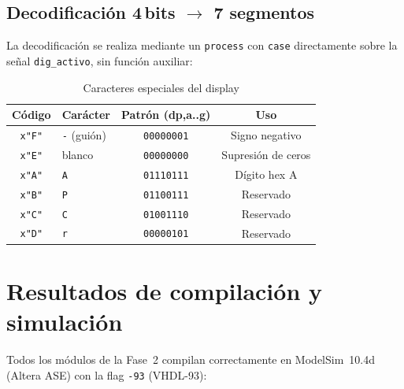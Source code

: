 \documentclass[memoria_final]{subfiles}
\begin{document}
\subsection{Decodificación 4\,bits $\to$ 7 segmentos}

La decodificación se realiza mediante un \texttt{process} con \texttt{case}
directamente sobre la señal \texttt{dig\_activo}, sin función auxiliar:

\begin{table}[H]
  \centering
  \caption{Caracteres especiales del display}
  \begin{tabular}{clcc}
    \toprule
    \textbf{Código} & \textbf{Carácter} &
    \textbf{Patrón (dp,a..g)} & \textbf{Uso} \\
    \midrule
    \texttt{x"F"} & \texttt{-} (guión) & \texttt{00000001} & Signo negativo \\
    \texttt{x"E"} & blanco             & \texttt{00000000} & Supresión de ceros \\
    \texttt{x"A"} & \texttt{A}         & \texttt{01110111} & Dígito hex A \\
    \texttt{x"B"} & \texttt{P}         & \texttt{01100111} & Reservado \\
    \texttt{x"C"} & \texttt{C}         & \texttt{01001110} & Reservado \\
    \texttt{x"D"} & \texttt{r}         & \texttt{00000101} & Reservado \\
    \bottomrule
  \end{tabular}
\end{table}
\FloatBarrier

\section{Resultados de compilación y simulación}

Todos los módulos de la Fase~2 compilan correctamente en ModelSim~10.4d
(Altera ASE) con la flag \texttt{-93} (VHDL-93):
\end{document}
